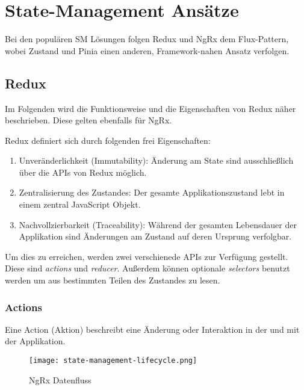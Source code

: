\chapter{State-Management Ansätze}

Bei den populären SM Lösungen folgen Redux und NgRx dem Flux-Pattern\cite{historyOfRedux}\cite{ngrxGettingStarted}, wobei Zustand und Pinia einen anderen, Framework-nahen Ansatz verfolgen.

\section{Redux}

Im Folgenden wird die Funktionsweise und die Eigenschaften von Redux näher beschrieben. Diese gelten ebenfalls für NgRx.

Redux definiert sich durch folgenden frei Eigenschaften:
\begin{enumerate}
  \item Unveränderlichkeit (Immutability): Änderung am State sind ausschließlich über die APIs von Redux möglich.
  \item Zentralisierung des Zustandes: Der gesamte Applikationszustand lebt in einem zentral JavaScript Objekt.
  \item Nachvollzierbarkeit (Traceability): Während der gesamten Lebensdauer der Applikation sind Änderungen am Zustand auf deren Ursprung verfolgbar.
\end{enumerate}

Um dies zu erreichen, werden zwei verschienede APIs zur Verfügung gestellt. Diese sind \textit{actions} und \textit{reducer}. Außerdem können optionale \textit{selectors} benutzt werden um aus bestimmten Teilen des Zustandes zu lesen.

\subsection{Actions}

Eine Action (Aktion) beschreibt eine Änderung oder Interaktion in der und mit der Applikation. 

\begin{figure}[h!]
\texttt{[image: state-management-lifecycle.png]}
\caption{NgRx Datenfluss}
\end{figure}